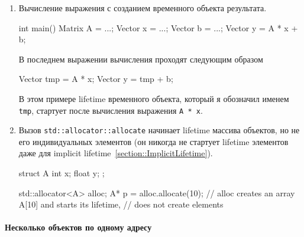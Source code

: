 \documentclass{article}
\begin{document}
\begin{enumerate}
\item Вычисление выражения с созданием временного объекта результата.
\begin{cppcode}[numbers = none]
int main() {
  Matrix A = ...;
  Vector x = ...;
  Vector b = ...;
  Vector y = A * x + b;
}
\end{cppcode}
В последнем выражении вычисления проходят следующим образом
\begin{cppcode}[numbers = none]
  Vector tmp = A * x;
  Vector y = tmp + b;
\end{cppcode}
В этом примере lifetime временного объекта, который я обозначил именем \verb"tmp", стартует после вычисления выражения \verb"A * x".
 
\item Вызов \verb"std::allocator::allocate" начинает lifetime массива объектов, но не его индивидуальных элементов (он никогда не стартует lifetime элементов даже для implicit lifetime~\ref{section::ImplicitLifetime}).
\begin{cppcode}[numbers = none]
struct A {
  int x;
  float y;
};

std::allocator<A> alloc;
A* p = alloc.allocate(10); // alloc creates an array A[10] and starts its lifetime,
                           // does not create elements
\end{cppcode}
\end{enumerate}

\paragraph{Несколько объектов по одному адресу}
\end{document}
